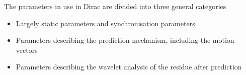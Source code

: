 The parameters in use in Dirac are divided into three general categories

\begin{itemize}
	\item Largely static parameters and synchronisation parameters
	\item Parameters describing the prediction mechanism, including the motion vectors
	\item Parameters describing the wavelet analysis of the residue after prediction
\end{itemize}
